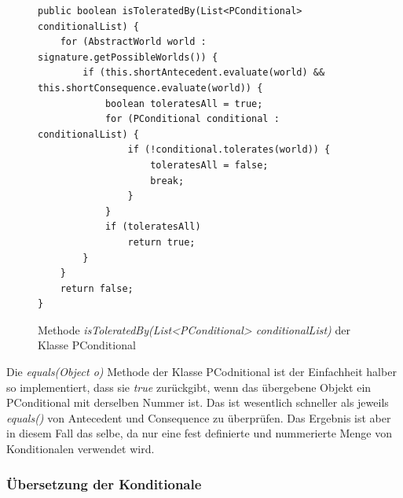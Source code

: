 \documentclass[12pt,a4paper]{article}
\begin{document}
\begin{figure}
\begin{lstlisting}
public boolean isToleratedBy(List<PConditional> conditionalList) {
    for (AbstractWorld world : signature.getPossibleWorlds()) {
        if (this.shortAntecedent.evaluate(world) && this.shortConsequence.evaluate(world)) {
            boolean toleratesAll = true;
            for (PConditional conditional : conditionalList) {
                if (!conditional.tolerates(world)) {
                    toleratesAll = false;
                    break;
                }
            }
            if (toleratesAll)
                return true;
        }
    }
    return false;
}
\end{lstlisting}
\caption{Methode \textit{isToleratedBy(List<PConditional> conditionalList)} der Klasse PConditional}
\label{code:conditional-istoleratedby}
\end{figure}




Die \textit{equals(Object o)} Methode der Klasse PCodnitional ist der Einfachheit halber so implementiert, dass sie \textit{true} zurückgibt, wenn das übergebene Objekt ein PConditional mit derselben Nummer ist. Das ist wesentlich schneller als jeweils \textit{equals()} von Antecedent und Consequence zu überprüfen. Das Ergebnis ist aber in diesem Fall das selbe, da nur eine fest definierte und nummerierte Menge von Konditionalen verwendet wird.


\subsubsection{Übersetzung der Konditionale}
\end{document}
